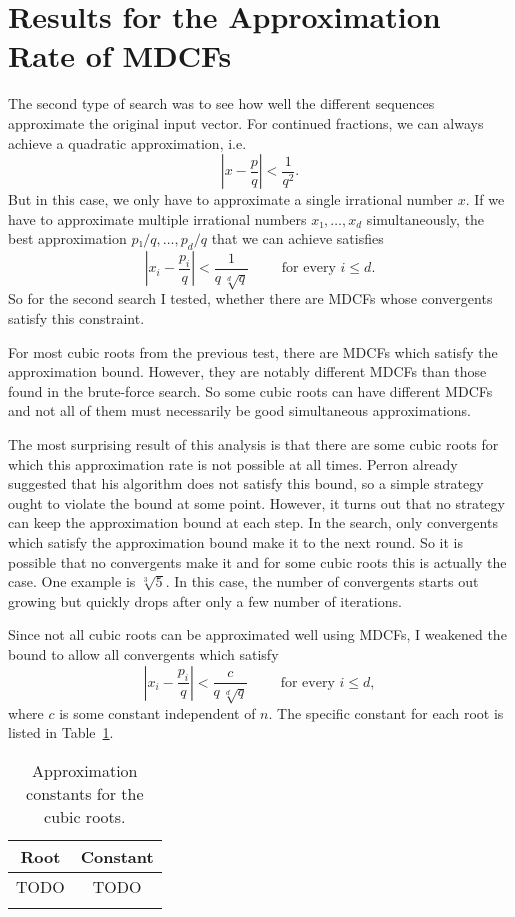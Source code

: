 \section{Results for the Approximation Rate of MDCFs}

The second type of search was to see how well the different sequences
approximate the original input vector.
For continued fractions, we can always achieve a quadratic approximation, i.e.
\[
  \left| x - \frac{p}{q} \right| < \frac{1}{q^2}.
\]
But in this case, we only have to approximate a single irrational number $x$.
If we have to approximate multiple irrational numbers $x₁, …, x_d$ simultaneously,
the best approximation $p₁/q, …, p_d/q$ that we can achieve satisfies
\[
  \left|x_i - \frac{p_i}{q}\right| < \frac{1}{q \, \sqrt[d]{q}} \qquad \text{ for every } i ≤ d.
\]
So for the second search I tested, whether there are MDCFs whose convergents
satisfy this constraint.

For most cubic roots from the previous test,
there are MDCFs which satisfy the approximation bound.
However, they are notably different MDCFs than those found in the brute-force
search.
So some cubic roots can have different MDCFs
and not all of them must necessarily be good simultaneous approximations.

The most surprising result of this analysis is that there are some cubic roots
for which this approximation rate is not possible at all times.
Perron already suggested that his algorithm does not satisfy this bound,
so a simple strategy ought to violate the bound at some point.
However, it turns out that no strategy can keep the approximation bound at each step.
In the search, only convergents which satisfy the approximation bound make it to the next round.
So it is possible that no convergents make it and for some cubic roots this is actually the case.
One example is $\sqrt[3]{5}$.
In this case, the number of convergents starts out growing but quickly drops
after only a few number of iterations.

Since not all cubic roots can be approximated well using MDCFs,
I weakened the bound to allow all convergents which satisfy
\[
  \left|x_i - \frac{p_i}{q}\right| < \frac{c}{q \, \sqrt[d]{q}} \qquad \text{ for every } i ≤ d,
\]
where $c$ is some constant independent of $n$.
The specific constant for each root is listed in Table~\ref{tbl:approx-const}.
\begin{table}[tbp]
  \centering
  \begin{tabular}{cc}
    \uzlhline
    Root & Constant \\
    \hline
    TODO & TODO \\
    \uzlhline
  \end{tabular}
  \caption{Approximation constants for the cubic roots.}
  \label{tbl:approx-const}
\end{table}

